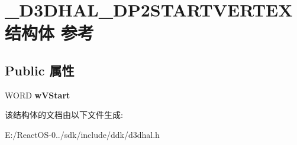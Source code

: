 \hypertarget{struct___d3_d_h_a_l___d_p2_s_t_a_r_t_v_e_r_t_e_x}{}\section{\+\_\+\+D3\+D\+H\+A\+L\+\_\+\+D\+P2\+S\+T\+A\+R\+T\+V\+E\+R\+T\+E\+X结构体 参考}
\label{struct___d3_d_h_a_l___d_p2_s_t_a_r_t_v_e_r_t_e_x}
\subsection*{Public 属性}
\begin{DoxyCompactItemize}
\item 
\mbox{\label{struct___d3_d_h_a_l___d_p2_s_t_a_r_t_v_e_r_t_e_x_a34e4c05b197856a58439955eb8eb30eb}} 
W\+O\+RD {\bfseries w\+V\+Start}
\end{DoxyCompactItemize}


该结构体的文档由以下文件生成\+:\begin{DoxyCompactItemize}
\item 
E\+:/\+React\+O\+S-\/0../sdk/include/ddk/d3dhal.\+h\end{DoxyCompactItemize}
